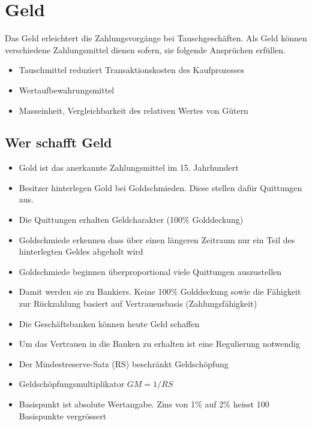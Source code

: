 \section{Geld}
Das Geld erleichtert die Zahlungsvorgänge bei Tauschgeschäften. Als Geld können verschiedene Zahlungsmittel dienen sofern, sie folgende Ansprüchen erfüllen.
\begin{itemize}
	\item Tauschmittel reduziert Transaktionskosten des Kaufprozesses
	\item Wertaufbewahrungsmittel
	\item Masseinheit, Vergleichbarkeit des relativen Wertes von Gütern
\end{itemize}
\subsection{Wer schafft Geld}
\begin{itemize}
	\item Gold ist das anerkannte Zahlungsmittel im 15. Jahrhundert
	\item Besitzer hinterlegen Gold bei Goldschmieden. Diese stellen dafür Quittungen aus.
	\item Die Quittungen erhalten Geldcharakter (100\% Golddeckung)
	\item Goldschmiede erkennen dass über einen längeren Zeitraum nur ein Teil des hinterlegten Geldes abgeholt wird
	\item Goldschmiede beginnen überproportional viele Quittungen auszustellen
	\item Damit werden sie zu Bankiers. Keine 100\% Golddeckung sowie die Fähigkeit zur Rückzahlung basiert auf Vertrauensbasis (Zahlungsfähigkeit)
	\item Die Geschäftsbanken können heute Geld schaffen
	\item Um das Vertrauen in die Banken zu erhalten ist eine Regulierung notwendig
	\item Der Mindestreserve-Satz (RS) beschränkt Geldschöpfung
	\item Geldschöpfungsmultiplikator $GM= 1/RS$
	\item Basispunkt ist absolute Wertangabe.
	\subitem Zins von 1\% auf 2\% heisst 100 Basispunkte vergrössert
\end{itemize}
